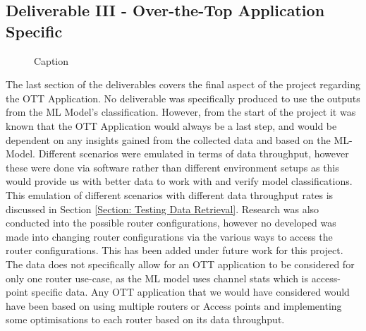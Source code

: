 \subsection{Deliverable III - Over-the-Top Application Specific}
\begin{figure}[ht]
    \centering
    \caption{Caption}
    \label{fig:ott_spec}
\end{figure}

The last section of the deliverables covers the final aspect of the project regarding the OTT Application. No deliverable was specifically produced to use the outputs from the ML Model's classification. However, from the start of the project it was known that the OTT Application would always be a last step, and would be dependent on any insights gained from the collected data and based on the ML-Model. Different scenarios were emulated in terms of data throughput, however these were done via software rather than different environment setups as this would provide us with better data to work with and verify model classifications. This emulation of different scenarios with different data throughput rates is discussed in Section \ref{Section: Testing Data Retrieval}. Research was also conducted into the possible router configurations, however no developed was made into changing router configurations via the various ways to access the router configurations. This has been added under future work for this project. The data does not specifically allow for an OTT application to be considered for only one router use-case, as the ML model uses channel stats which is access-point specific data. Any OTT application that we would have considered would have been based on using multiple routers or Access points and implementing some optimisations to each router based on its data throughput. 

